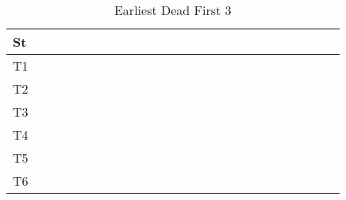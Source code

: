 \documentclass[xcolor=table]{beamer}
\begin{document}
\begin{frame}
\begin{table}
{\begin{tabular}{|l|l|l|l|l|l|l|l|l|l|l|l|l|l|l|l|l|l|l|l|l|l|l|l|l|}
St & \cellcolor{green} & \cellcolor{green} & \cellcolor{green} & \cellcolor{green} & \cellcolor{green} & \cellcolor{green} & \cellcolor{green} & \cellcolor{green} & \cellcolor{green} & \cellcolor{green} & \cellcolor{green} & \cellcolor{green} & \cellcolor{green} & \cellcolor{green} & \cellcolor{green} & \cellcolor{green} & \cellcolor{green} & \cellcolor{green} & \cellcolor{green} & \cellcolor{green} & \cellcolor{green} & \cellcolor{green} & \cellcolor{green} & \cellcolor{red} \\ \hline 
T1 & & & & & & & & & & & & & & & & & & & & & & & & \\ \hline 
T2 & & & & & & & & & & & & & & & & & & & & & & & & \\ \hline 
T3 & & & & & & & & & & & & & & & & & & & & & & & & \\ \hline 
T4 & \cellcolor{gray} & \cellcolor{gray} & \cellcolor{gray} & \cellcolor{gray} & \cellcolor{gray} & \cellcolor{gray} & \cellcolor{gray} & \cellcolor{gray} & \cellcolor{gray} & \cellcolor{gray} & \cellcolor{gray} & \cellcolor{gray} & \cellcolor{gray} & \cellcolor{gray} & \cellcolor{gray} & \cellcolor{gray} & \cellcolor{gray} & \cellcolor{gray} & \cellcolor{gray} & \cellcolor{gray} & \cellcolor{gray} & \cellcolor{gray} & \cellcolor{gray} & \cellcolor{gray} \\ \hline 
T5 & & & & & & & & & & & & & & & & & & & & & & & & \\ \hline 
T6 & & & & & & & & & & & & & & & & & & & & & & & & \\ \hline 
\end{tabular} 
} 
\caption{ Earliest Dead First 3 } 
\end{table} 
\begin{table} 
\centering 
{}
\end{table}
\end{frame}
\end{document}
